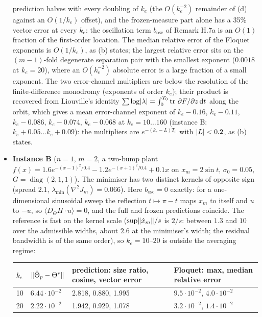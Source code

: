 \begin{itemize}
    prediction halves with every doubling of $k_e$ (the $O(k_e^{-2})$ remainder of (d) against an $O(1/k_e)$ offset),
    and the frozen-measure part alone has a 35\% vector error at every $k_e$: the oscillation term $b_{\mathrm{osc}}$
    of Remark H.7a is an $O(1)$ fraction of the first-order location. The median relative error of the Floquet
    exponents is $O(1/k_e)$, as (b) states; the largest relative error sits on the $(m-1)$-fold degenerate separation
    pair with the smallest exponent ($0.0018$ at $k_e = 20$), where an $O(k_e^{-2})$ absolute error is a large
    fraction of a small exponent. The two error-channel multipliers are below the resolution of the finite-difference
    monodromy (exponents of order $k_e$); their product is recovered from Liouville's identity
    $\sum\log\abs{\lambda} = \int_0^{T_0}\tr\,\partial F/\partial z\dd t$ along the orbit, which gives a mean
    error-channel exponent of $k_e - 0.16$, $k_e - 0.11$, $k_e - 0.086$, $k_e - 0.074$, $k_e - 0.068$ at
    $k_e = 10\dots160$ (instance B: $k_e + 0.05\dots k_e + 0.09$): the multipliers are $e^{-(k_e - L)T_0}$ with
    $\abs{L} < 0.2$, as (b) states.
  \item \textbf{Instance B} ($n = 1$, $m = 2$, a two-bump plant
    $f(x) = 1.6e^{-(x-1)^2/0.4} - 1.2e^{-(x+1)^2/0.4} + 0.1x$ on $x_m = 2\sin t$, $\sigma_0 = 0.05$,
    $G = \operatorname{diag}(2,1,1)$). The minimiser has two distinct kernels of opposite sign (spread $2.1$,
    $\lambda_{\min}(\nabla^2J_m) = 0.066$). Here $b_{\mathrm{osc}} = 0$ exactly: for a one-dimensional sinusoidal
    sweep the reflection $t\mapsto\pi - t$ maps $x_m$ to itself and $u$ to $-u$, so $\langle D_\Theta H\cdot u\rangle = 0$,
    and the full and frozen predictions coincide. The reference is fast on the kernel scale ($\sup\lVert \dot x_m\rVert/s$
    is $2/s$: between $1.3$ and $10$ over the admissible widths, about $2.6$ at the minimiser's width; the residual
    bandwidth is of the same order), so $k_e = 10$--$20$ is outside the averaging regime:
    \begin{center}
    \small
    \begin{tabularx}{\linewidth}{@{}llYY@{}}
    \toprule
    $k_e$ & $\lVert \bar\Theta_p - \Theta^*\rVert$ & prediction: size ratio, cosine, vector error
      & Floquet: max, median relative error\\
      & $6.44\cdot10^{-2}$ & 2.818, 0.880, 1.995 & $9.5\cdot10^{-2}$, $4.0\cdot10^{-2}$\\
    20  & $2.22\cdot10^{-2}$ & 1.942, 0.929, 1.078 & $3.2\cdot10^{-2}$, $1.4\cdot10^{-2}$\\

\end{tabularx}
\end{center}
\end{itemize}
